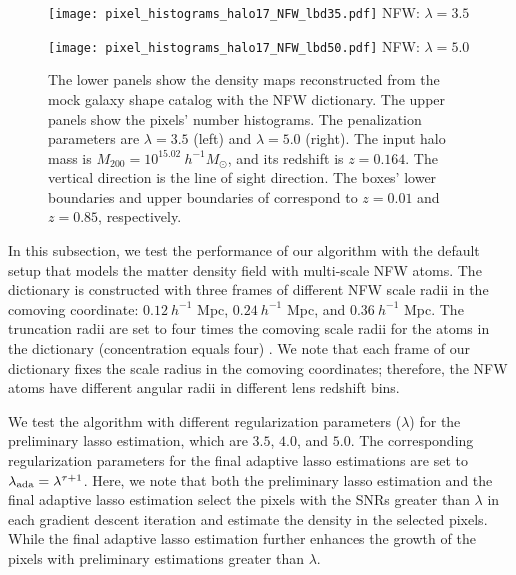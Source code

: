 \begin{figure*}[!t]
\begin{minipage}[c]{1.0\columnwidth}
\texttt{[image: pixel\_histograms\_halo17\_NFW\_lbd35.pdf]}
    \centering
    \small NFW: $\lambda=3.5$
\end{minipage}
\begin{minipage}[c]{1.0\columnwidth}
\texttt{[image: pixel\_histograms\_halo17\_NFW\_lbd50.pdf]}
    \centering
    \small
    NFW: $\lambda=5.0$
\end{minipage}
\caption{The lower panels show the density maps reconstructed from the mock
    galaxy shape catalog with the NFW dictionary. The upper panels show the
    pixels' number histograms.  The penalization parameters are $\lambda=3.5$
    (left) and $\lambda=5.0$ (right).  The input halo mass is
    $M_{200}=10^{15.02} ~h^{-1}M_{\odot}$, and its redshift is $z=0.164$.  The
    vertical direction is the line of sight direction. The boxes' lower
    boundaries and upper boundaries of correspond to $z=0.01$ and $z=0.85$,
    respectively.
    } \label{fig_NFW3D}
\end{figure*}

In this subsection, we test the performance of our algorithm with the default
setup that models the matter density field with multi-scale NFW atoms. The
dictionary is constructed with three frames of different NFW scale radii in the
comoving coordinate: $0.12~h^{-1}$ Mpc, $0.24~h^{-1}$ Mpc, and $0.36~h^{-1}$
Mpc.  The truncation radii are set to four times the comoving scale radii for
the atoms in the dictionary (concentration equals four) . We note that each
frame of our dictionary fixes the scale radius in the comoving coordinates;
therefore, the NFW atoms have different angular radii in different lens
redshift bins.

We test the algorithm with different regularization parameters ($\lambda$) for
the preliminary lasso estimation, which are $3.5$, $4.0$, and $5.0$. The
corresponding regularization parameters for the final adaptive lasso
estimations are set to $\lambda_{\rm{ada}}=\lambda^{\tau+1}$.  Here, we note
that both the preliminary lasso estimation and the final adaptive lasso
estimation select the pixels with the SNRs greater than $\lambda$ in each
gradient descent iteration and estimate the density in the selected pixels.
While the final adaptive lasso estimation further enhances the growth of the
pixels with preliminary estimations greater than $\lambda$.

